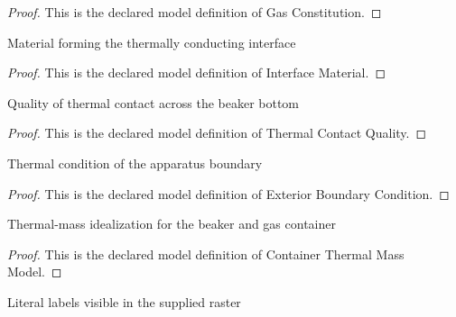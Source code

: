 \begin{proof}
  This is the declared model definition of Gas Constitution.
\end{proof}
\begin{definition}
  \label{def:physics:phyx-mini-0406:phyxminiproblems-problemphyxmini0406-interfacematerial}
  Material forming the thermally conducting interface
\end{definition}
\begin{proof}
  This is the declared model definition of Interface Material.
\end{proof}
\begin{definition}
  \label{def:physics:phyx-mini-0406:phyxminiproblems-problemphyxmini0406-thermalcontactquality}
  Quality of thermal contact across the beaker bottom
\end{definition}
\begin{proof}
  This is the declared model definition of Thermal Contact Quality.
\end{proof}
\begin{definition}
  \label{def:physics:phyx-mini-0406:phyxminiproblems-problemphyxmini0406-exteriorboundarycondition}
  Thermal condition of the apparatus boundary
\end{definition}
\begin{proof}
  This is the declared model definition of Exterior Boundary Condition.
\end{proof}
\begin{definition}
  \label{def:physics:phyx-mini-0406:phyxminiproblems-problemphyxmini0406-containerthermalmassmodel}
  Thermal-mass idealization for the beaker and gas container
\end{definition}
\begin{proof}
  This is the declared model definition of Container Thermal Mass Model.
\end{proof}
\begin{definition}
  \label{def:physics:phyx-mini-0406:phyxminiproblems-problemphyxmini0406-figurelabel}
  Literal labels visible in the supplied raster
\end{definition}
